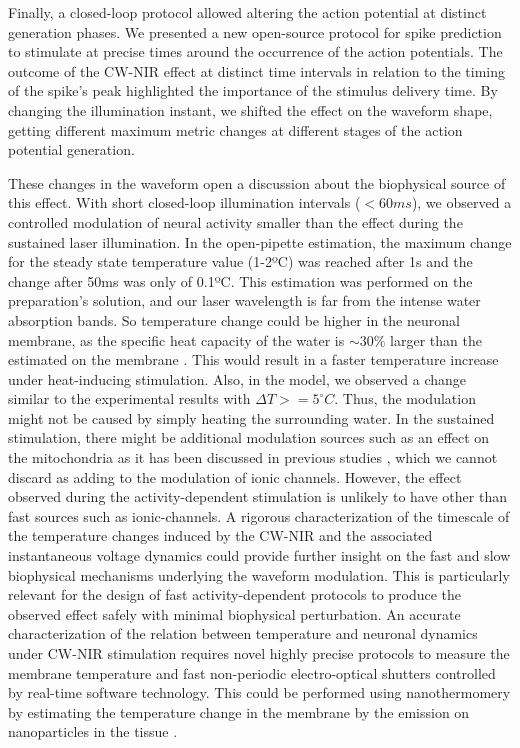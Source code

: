 Finally, a closed-loop protocol allowed altering the action potential at distinct generation phases. We presented a new open-source protocol for spike prediction to stimulate at precise times around the occurrence of the action potentials. The outcome of the CW-NIR effect at distinct time intervals in relation to the timing of the spike's peak highlighted the importance of the stimulus delivery time. By changing the illumination instant, we shifted the effect on the waveform shape, getting different maximum metric changes at different stages of the action potential generation.

These changes in the waveform open a discussion about the biophysical source of this effect. With short closed-loop illumination intervals ($<60ms$), we observed a controlled modulation of neural activity smaller than the effect during the sustained laser illumination. In the open-pipette estimation, the maximum change for the steady state temperature value (1-2ºC) was reached after 1s and the change after 50ms was only of 0.1ºC. This estimation was performed on the preparation's solution, and our laser wavelength is far from the intense water absorption bands. So temperature change could be higher in the neuronal membrane, as the specific heat capacity of the water is $\sim30\%$ larger than the estimated on the membrane \parencite{thompson_modeling_2012}. This would result in a faster temperature increase under heat-inducing stimulation. Also, in the model, we observed a change similar to the experimental results with $\Delta T>=5^{\circ}C$. Thus, the modulation might not be caused by simply heating the surrounding water. In the sustained stimulation, there might be additional modulation sources such as an effect on the mitochondria as it has been discussed in previous studies \parencite{dittami_intracellular_2011, lumbreras_pulsed_2014, saucedo_transcranial_2021}, which we cannot discard as adding to the modulation of ionic channels. However, the effect observed during the activity-dependent stimulation is unlikely to have other than fast sources such as ionic-channels. 
A rigorous characterization of the timescale of the temperature changes induced by the CW-NIR and the associated instantaneous voltage dynamics could provide further insight on the fast and slow biophysical mechanisms underlying the waveform modulation. This is particularly relevant for the design of fast activity-dependent protocols to produce the observed effect safely with minimal biophysical perturbation. An accurate characterization of the relation between temperature and neuronal dynamics under CW-NIR stimulation requires novel highly precise protocols to measure the membrane temperature and fast non-periodic electro-optical shutters controlled by real-time software technology. This could be performed using nanothermomery by estimating the temperature change in the membrane by the emission on nanoparticles in the tissue \parencite{hamraoui_exploring_2023}.

